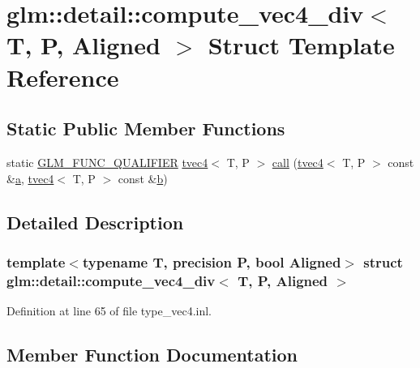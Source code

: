 \hypertarget{structglm_1_1detail_1_1compute__vec4__div}{}\section{glm\+::detail\+::compute\+\_\+vec4\+\_\+div$<$ T, P, Aligned $>$ Struct Template Reference}
\label{structglm_1_1detail_1_1compute__vec4__div}
\subsection*{Static Public Member Functions}
\begin{DoxyCompactItemize}
\item 
static \mbox{\hyperlink{setup_8hpp_a33fdea6f91c5f834105f7415e2a64407}{G\+L\+M\+\_\+\+F\+U\+N\+C\+\_\+\+Q\+U\+A\+L\+I\+F\+I\+ER}} \mbox{\hyperlink{structglm_1_1tvec4}{tvec4}}$<$ T, P $>$ \mbox{\hyperlink{structglm_1_1detail_1_1compute__vec4__div_aad8aa773a84ae85242106b29186eab7a}{call}} (\mbox{\hyperlink{structglm_1_1tvec4}{tvec4}}$<$ T, P $>$ const \&\mbox{\hyperlink{glad_8h_ac8729153468b5dcf13f971b21d84d4e5}{a}}, \mbox{\hyperlink{structglm_1_1tvec4}{tvec4}}$<$ T, P $>$ const \&\mbox{\hyperlink{glad_8h_a6eba317e3cf44d6d26c04a5a8f197dcb}{b}})
\end{DoxyCompactItemize}


\subsection{Detailed Description}
\subsubsection*{template$<$typename T, precision P, bool Aligned$>$\newline
struct glm\+::detail\+::compute\+\_\+vec4\+\_\+div$<$ T, P, Aligned $>$}



Definition at line 65 of file type\+\_\+vec4.\+inl.



\subsection{Member Function Documentation}
\mbox{\label{structglm_1_1detail_1_1compute__vec4__div_aad8aa773a84ae85242106b29186eab7a}} 

